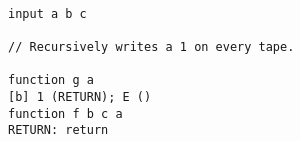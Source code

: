 { \scriptsize \tt
\begin{lstlisting}
input a b c

// Recursively writes a 1 on every tape.

function g a 
[b] 1 (RETURN); E ()
function f b c a
RETURN: return
\end{lstlisting}
}